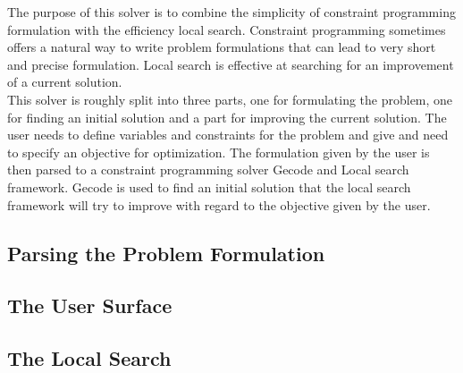 The purpose of this solver is to combine the simplicity of constraint programming formulation with the 
efficiency local search. Constraint programming sometimes offers a natural way to write problem formulations that can 
lead to very short and precise formulation. Local search is effective at searching for an improvement of a current 
solution. \\ 
This solver is roughly split into three parts, one for formulating the problem, one for finding an initial solution and 
a part for improving the current solution. The user needs to define variables and constraints for the problem and 
give and need to specify an objective for optimization. The formulation given by the user is then parsed to a 
constraint programming solver Gecode and Local search framework. Gecode is used to find an initial solution that the 
local search framework will try to improve with regard to the objective given by the user.   

\subsection{Parsing the Problem Formulation}

\subsection{The User Surface}
\subsection{The Local Search}